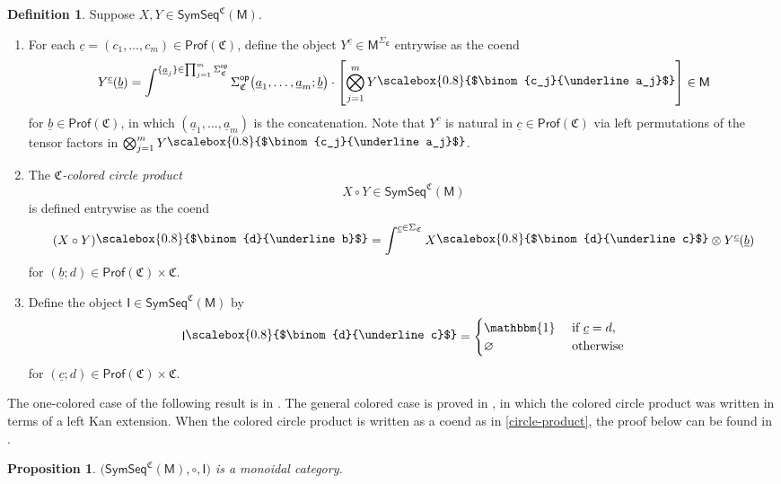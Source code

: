 \documentclass{amsbook}
\numberwithin{section}{chapter}
\numberwithin{subsection}{section}
\numberwithin{equation}{section}
\theoremstyle{plain}
\newtheorem{proposition}[equation]{Proposition}
\theoremstyle{definition}
\newtheorem{definition}[equation]{Definition}
\newcommand{\colorc}{\mathfrak{C}}
\newcommand{\Prof}{\mathsf{Prof}}
\newcommand{\Profc}{\Prof(\colorc)}
\newcommand{\Profcc}{\Profc \times \colorc}
\newcommand{\op}{\mathsf{op}}
\newcommand{\I}{\mathsf{I}}
\newcommand{\M}{\mathsf{M}}
\newcommand{\tensorunit}{\mathbbm{1}}
\renewcommand{\emptyset}{\varnothing}
\newcommand{\Sigmaop}{\Sigma^{\op}}
\newcommand{\Sigmac}{\Sigma_{\colorc}}
\newcommand{\Sigmacop}{\Sigmaop_{\colorc}}
\newcommand{\symseq}{\mathsf{SymSeq}}
\newcommand{\symseqcm}{\symseq^{\colorc}(\M)}
\newcommand{\ua}{\underline a}
\newcommand{\ub}{\underline b}
\newcommand{\uc}{\underline c}
\newcommand{\smallprof}[1]
{\raisebox{.05cm}{\scalebox{0.8}{#1}}}
\newcommand{\cjuaj}{\smallprof{$\binom{c_j}{\ua_j}$}}
\newcommand{\dub}{\smallprof{$\binom{d}{\ub}$}}
\newcommand{\duc}{\smallprof{$\binom{d}{\uc}$}}
\begin{document}
\begin{definition}\label{def:colored-circle-product}
Suppose $X,Y  \in \symseqcm$.
\begin{enumerate}
\item For each $\uc = (c_1,\ldots,c_m) \in \Profc$, define the object $Y^{\uc} \in \M^{\Sigmac}$ entrywise as the coend
\begin{equation}\label{ytensorc}
Y^{\uc}(\ub) = \int^{\{\ua_j\}\in\prod_{j=1}^m \Sigmacop} \Sigmacop\bigl(\ua_1,\ldots,\ua_m;\ub\bigr) \cdot \left[\bigotimes_{j=1}^m Y\cjuaj\right] \in \M
\end{equation}
for $\ub \in \Profc$, in which $(\ua_1,\ldots,\ua_m)$ is the concatenation.	 Note that $Y^{\uc}$ is natural in $\uc \in \Profc$ via left permutations of the tensor factors in $\bigotimes_{j=1}^m Y\cjuaj$.
\item The \emph{$\colorc$-colored circle product} \[X \circ Y \in \symseqcm\] is defined entrywise as the coend
\begin{equation}\label{circle-product}
(X \circ Y)\dub = \int^{\uc \in \Sigmac} X\duc \otimes Y^{\uc}(\ub) 
\end{equation}
for $(\ub;d) \in \Profcc$.
\item Define the object $\I \in \symseqcm$ by
\begin{equation}\label{unit-operad}
\I\duc = \begin{cases} \tensorunit & \text{ if $\uc=d$},\\
\emptyset & \text{ otherwise}\end{cases}
\end{equation}
for $(\uc;d) \in \Profcc$.
\end{enumerate}
\end{definition}

The one-colored case of the following result is in \cite{kelly}.  The general colored case is proved in \cite{white-yau}, in which the colored circle product was written in terms of a left Kan extension.  When the colored circle product is written as a coend as in \eqref{circle-product}, the proof below can be found in \cite{bsw}.

\begin{proposition}\label{circle-product-monoidal}
$\bigl(\symseqcm, \circ, \I\bigr)$ is a monoidal category.
\end{proposition}
\end{document}
